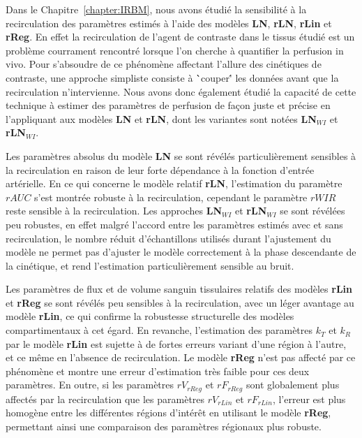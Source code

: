 \begin{otherlanguage}{francais}
Dans le Chapitre~\ref{chapter:IRBM}, nous avons \'etudi\'e la sensibilit\'e \`a la recirculation des param\`etres estim\'es \`a l'aide des mod\`eles \textbf{LN}, \textbf{rLN}, \textbf{rLin} et \textbf{rReg}.
En effet la recirculation de l'agent de contraste dans le tissus \'etudi\'e est un probl\`eme courrament rencontr\'e lorsque l'on cherche \`a quantifier la perfusion in vivo.
Pour s'absoudre de ce ph\'enom\`ene affectant l'allure des cin\'etiques de contraste, une approche simpliste consiste \`a \``couper\'' les donn\'ees avant que la recirculation n'intervienne.
Nous avons donc \'egalement \'etudi\'e la capacit\'e de cette technique \`a estimer des param\`etres de perfusion de fa\c{c}on juste et pr\'ecise en l'appliquant aux mod\`eles \textbf{LN} et \textbf{rLN}, dont les variantes sont not\'ees \textbf{LN$_{WI}$} et \textbf{rLN$_{WI}$}.

Les param\`etres absolus du mod\`ele \textbf{LN} se sont r\'ev\'el\'es particuli\`erement sensibles \`a la recirculation en raison de leur forte d\'ependance \`a la fonction d'entr\'ee art\'erielle.
En ce qui concerne le mod\`ele relatif \textbf{rLN}, l'estimation du param\`etre $rAUC$ s'est montr\'ee robuste \`a la recirculation, cependant le param\`etre $rWIR$ reste sensible \`a la recirculation.
Les approches \textbf{LN$_{WI}$} et \textbf{rLN$_{WI}$} se sont r\'ev\'el\'ees peu robustes, en effet malgr\'e l'accord entre les param\`etres estim\'es avec et sans recirculation, le nombre r\'eduit d'\'echantillons utilis\'es durant l'ajustement du mod\`ele ne permet pas d'ajuster le mod\`ele correctement \`a la phase descendante de la cin\'etique, et rend l'estimation particuli\`erement sensible au bruit.

Les param\`etres de flux et de volume sanguin tissulaires relatifs des mod\`eles \textbf{rLin} et \textbf{rReg} se sont r\'ev\'el\'es peu sensibles \`a la recirculation, avec un l\'eger avantage au mod\`ele \textbf{rLin}, ce qui confirme la robustesse structurelle des mod\`eles compartimentaux \`a cet \'egard.
En revanche, l'estimation des param\`etres $k_T$ et $k_R$ par le mod\`ele \textbf{rLin} est sujette \`a de fortes erreurs variant d'une r\'egion \`a l'autre, et ce m\^eme en l'absence de recirculation.
Le mod\`ele \textbf{rReg} n'est pas affect\'e par ce ph\'enom\`ene et montre une erreur d'estimation tr\`es faible pour ces deux param\`etres.
En outre, si les param\`etres $rV_{rReg}$ et $rF_{rReg}$ sont globalement plus affect\'es par la recirculation que les param\`etres $rV_{rLin}$ et $rF_{rLin}$, l'erreur est plus homog\`ene entre les diff\'erentes r\'egions d'int\'er\^et en utilisant le mod\`ele \textbf{rReg}, permettant ainsi une comparaison des param\`etres r\'egionaux plus robuste.


\end{otherlanguage}
